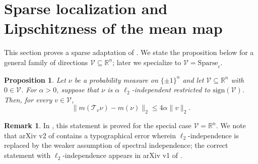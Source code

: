 \documentclass[11pt,reqno,letterpaper]{amsart}
\numberwithin{equation}{section}
\newtheorem{proposition}[theorem]{Proposition}
\theoremstyle{definition}
\newtheorem{remark}[theorem]{Remark}
\newcommand{\mb}{\mathbb}
\newcommand{\mc}{\mathcal}
\begin{document}
\section{Sparse localization and Lipschitzness of the mean map}\label{sec:lipschitz}



This section proves a sparse adaptation of \cite[Lemma~68]{chen2022localization}. We state the proposition below for a general family of directions $\mathcal{V}\subseteq\mathbb{R}^n$; later we specialize to
$\mathcal{V}=\mathrm{Sparse}_c$.



\begin{proposition}
\label{lem:lemma68}
Let $\nu$ be a probability measure on $\{\pm 1\}^n$ and let $\mc{V} \subseteq \mb{R}^n$ with $0 \in \mc{V}$. For $\alpha > 0$, suppose that $\nu$ is $\alpha$ $\ell_2$-independent restricted to $\mathrm{sign}(\mc{V})$. Then, for every $v \in \mathcal{V}$,
\[
\| m(\mathcal{T}_v \nu) - m(\nu) \|_2
\le 4 \alpha \|v\|_2.
\]
\end{proposition}
\begin{remark}
    In \cite[Lemma~68]{chen2022localization}, this statement is proved for the special case $\mc{V} = \mb{R}^n$. We note that arXiv v2 of \cite{chen2022localization} contains a typographical error wherein $\ell_2$-independence is replaced by the weaker assumption of spectral independence; the correct statement with $\ell_2$-independence appears in arXiv v1 of \cite{chen2022localization}. 
\end{remark}
\end{document}
